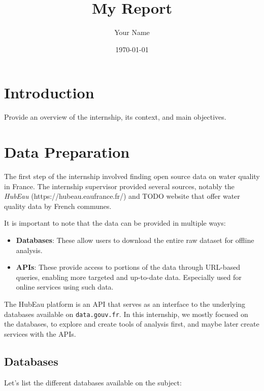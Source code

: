 \documentclass{article}
\title{My Report}
\author{Your Name}
\date{\today}
\begin{document}
\maketitle

\newpage
\tableofcontents
\newpage

\section{Introduction}
Provide an overview of the internship, its context, and main objectives.

\section{Data Preparation}
The first step of the internship involved finding open source data on water quality in France. The internship supervisor provided several sources, notably the \textit{HubEau} (https://hubeau.eaufrance.fr/) and TODO website that offer water quality data by French communes.

It is important to note that the data can be provided in multiple ways:
\begin{itemize}
    \item \textbf{Databases}: These allow users to download the entire raw dataset for offline analysis.
    \item \textbf{APIs}: These provide access to portions of the data through URL-based queries, enabling more targeted and up-to-date data. Especially used for online services using such data.
\end{itemize}

The HubEau platform is an API that serves as an interface to the underlying databases available on \texttt{data.gouv.fr}.
In this internship, we mostly focused on the databases, to explore and create tools of analysis first, and maybe later create services with the APIs.
\subsection{Databases}
Let's list the different databases available on the subject:
\end{document}
